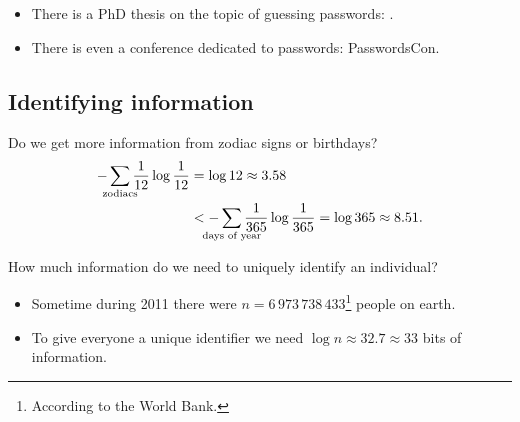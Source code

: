\begin{frame}
  \begin{remark}
    \begin{itemize}
      \item There is a PhD thesis on the topic of guessing passwords: 
        .
      \item There is even a conference dedicated to passwords: PasswordsCon.
    \end{itemize}
  \end{remark}
\end{frame}

\subsection{Identifying information}

\begin{frame}
  \begin{example}
    Do we get more information from zodiac signs or birthdays?
    \begin{align*}
      -\sum_{\mathclap{\text{zodiacs}}} \frac{1}{12} \log\frac{1}{12} &= \log 12 
      \approx 3.58 \\
      &< -\sum_{\mathclap{\text{days of year}}} \frac{1}{365} \log\frac{1}{365} 
      = \log 365 \approx 8.51.
    \end{align*}
  \end{example}
\end{frame}

\begin{frame}
  \begin{exercise}
    How much information do we need to uniquely identify an individual?
  \end{exercise}
\end{frame}

\begin{frame}
  \begin{example}
    \begin{itemize}
      \item Sometime during 2011 there were \(n = 6\,973\,738\,433\)\footnote{%
          According to the World Bank.
        } people on earth.

      \item To give everyone a unique identifier we need \(\log n\approx 
          32.7\approx 33\) bits of information.
    \end{itemize}
  \end{example}
\end{frame}

